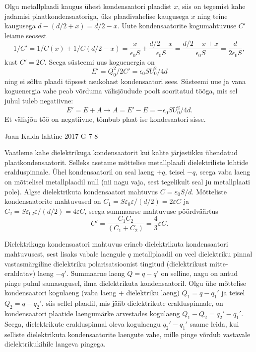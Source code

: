 \documentclass[11pt]{article}
\begin{document}
{{Olgu metallplaadi kaugus ühest kondensaatori plaadist $x$, siis on tegemist kahe jadamisi plaatkondensaatoriga, üks plaadivahelise kaugusega $x$ ning teine kaugusega $d - (d/2 + x) = d/2 - x$. Uute kondensaatorite kogumahtuvuse $C'$ leiame seosest $$1/C' = 1/C(x) + 1/C(d/2-x) = \frac{x}{\epsilon_0 S} + \frac{d/2 - x}{\epsilon_0 S} = \frac{d/2 - x + x}{\epsilon_0 S} = \frac{d}{2 \epsilon_0 S},$$kust $C' = 2C$. Seega süsteemi uus koguenergia on $$E' = Q_0^2 / 2C' = \epsilon_0 S U_0^2/ 4 d$$ ning ei sõltu plaadi täpsest asukohast kondensaatori sees. Süsteemi uue ja vana koguenergia vahe peab võrduma välisjõudude poolt sooritatud tööga, mis sel juhul tuleb negatiivne:
$$E' = E + A \rightarrow A = E' - E = - \epsilon_0 S U_0^2/ 4 d.$$
Et välisjõu töö on negatiivne, tõmbub plaat ise kondesaatori sisse.
\fi
}

{Jaan Kalda} %
{lahtine} %
{2017} %
{G 7} %
{8} %
{

\ifSolution
Vaatleme kahe dielektrikuga kondensaatorit kui kahte järjestikku ühendatud plaatkondensaatorit. Selleks asetame mõttelise metallplaadi dielektriliste kihtide eralduspinnale. Ühel kondensaatoril on seal laeng $+q$, teisel $-q$, seega vaba laeng on mõttelisel metallplaadil null (nii nagu vaja, sest tegelikult seal ju metallplaati pole). Algse dielektrikuta kondensaatori mahtuvus $C=\varepsilon_0S/d$. Mõtteliste kondensaatorite mahtuvused on $C_1=S\varepsilon_0\varepsilon/(d/2)=2\varepsilon C$ ja $C_2=S\varepsilon_02\varepsilon/(d/2)=4\varepsilon C$, seega summaarse mahtuvuse pöördväärtus 
\[
C'=\frac{C_1C_2}{(C_1+C_2)}=\frac 43\varepsilon C.
\]

Dielektrikuga kondensaatori mahtuvus erineb dielektrikuta kondensaatori mahtuvusest, sest lisaks vabale laengule $q$ metallplaadil on veel dielektriku pinnal vastasmärgiline dielektriku polarisatsioonist tingitud (dielektrikust mitte-eraldatav) laeng $-q'$. Summaarne laeng $Q=q-q'$ on selline, nagu on antud pinge puhul samasugusel, ilma dielektrikuta kondensaatoril. Olgu ühe mõttelise kondensaatori kogulaeng (vaba laeng + dielektriku laeng) $Q_1=q-q_1'$ ja teisel $Q_2=q-q_2'$, siis sellel plaadil, mis jääb dielektrikute eralduspinnale, on kondensaatori plaatide laengumärke arvestades kogulaeng $Q_1-Q_2=q_2'-q_1'$. Seega, dielektrikute eralduspinnal oleva kogulaengu $q_2'-q_1'$ saame leida, kui selliste dielektrikuta kondensaatorite laengute vahe, mille pinge võrdub vastavale dielektrikukihile langeva pingega. 

}}
\end{document}
